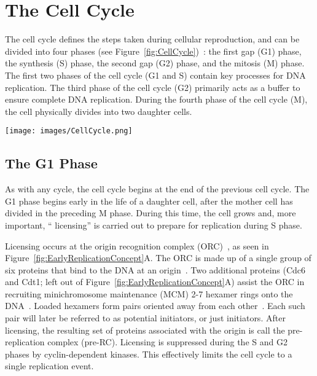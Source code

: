 	\section{The Cell Cycle}
	\label{sec:CellCycle}
	
	The cell cycle defines the steps taken during cellular reproduction, and can be divided into four phases (see Figure~\ref{fig:CellCycle})~\cite{MolecularCellBiology,CellMolApproach}:
	the first gap (G1) phase, the synthesis (S) phase, the second gap (G2) phase, and the mitosis (M) phase.
	The first two phases of the cell cycle (G1 and S) contain key processes for DNA replication.
	The third phase of the cell cycle (G2) primarily acts as a buffer to ensure complete DNA replication.
	During the fourth phase of the cell cycle (M), the cell physically divides into two daughter cells.
	
	\begin{SCfigure}[1][thb]
		\texttt{[image: images/CellCycle.png]}
		\caption[Cell Cycle]{\label{fig:CellCycle} The complete cell cycle is made up of four phases: 
			the Mitosis (M) phase, when a mother cell separates into two daughter cells; 
			the first Gap (G1) phase, when the daughter cell undergoes growth and chemical preparation for DNA replication;
			the Synthesis (S) phase, when the DNA is replicated;
			and the second Gap (G2) phase which acts as a buffer to ensure complete replication before the M phase.}
	\end{SCfigure}
	
	
		\subsection{The G1 Phase}
		\label{subsec:G1Phase}
		
		As with any cycle, the cell cycle begins at the end of the previous cell cycle.
		The G1 phase begins early in the life of a daughter cell, after the mother cell has divided in the preceding M phase.
		During this time, the cell grows and, more important, `` licensing'' is carried out to prepare for replication during S phase.
		
		Licensing occurs at the origin recognition complex (ORC)~\cite{DNAInitiation}, as seen in Figure~\ref{fig:EarlyReplicationConcept}A.
		The ORC is made up of a single group of six proteins that bind to the DNA at an origin~\cite{ORC}.
		Two additional proteins (Cdc6 and Cdt1; left out of Figure~\ref{fig:EarlyReplicationConcept}A) assist the ORC in recruiting minichromosome maintenance (MCM) 2-7 hexamer rings onto the DNA~\cite{DNARepInitiation}.
		Loaded hexamers form pairs oriented away from each other~\cite{MCMPairs}.
		Each such pair will later be referred to as potential initiators, or just initiators.
		After licensing, the resulting set of proteins associated with the origin is call the pre-replication complex (pre-RC).
		Licensing is suppressed during the S and G2 phases by cyclin-dependent kinases.
		This effectively limits the cell cycle to a single replication event.~\cite{MolecularCellBiology}
		
